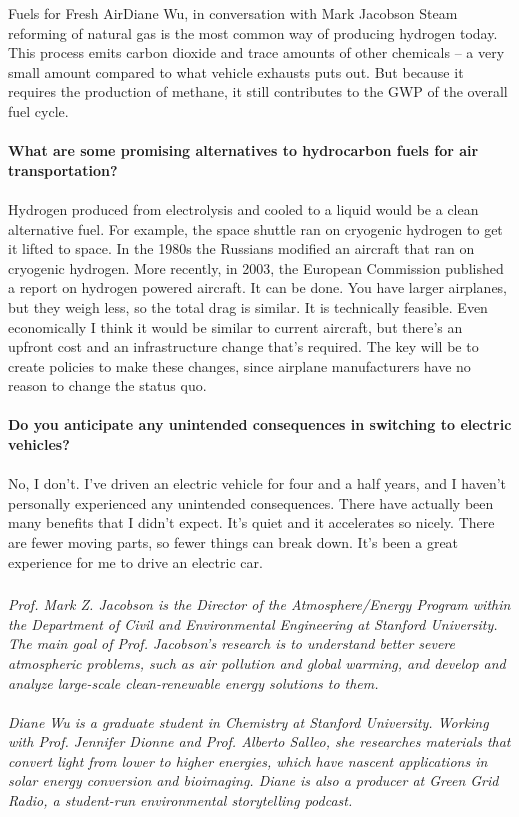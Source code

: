 \documentclass[10pt]{papertex}
\begin{document}
\begin{news}{2}{Fuels for Fresh Air}{Diane Wu, in conversation with Mark Jacobson}{}{}
Steam reforming of natural gas is the most common way of producing hydrogen 
today. This process emits carbon dioxide and trace amounts of other 
chemicals – a very small amount compared to what vehicle exhausts puts out. 
But because it requires the production of methane, it still contributes to 
the GWP of the overall fuel cycle.
\\
\\
\textbf{What are some promising alternatives to hydrocarbon fuels for air 
    transportation?}
\\
\\
Hydrogen produced from electrolysis and cooled to a liquid would be a clean 
alternative fuel. For example, the space shuttle ran on cryogenic hydrogen to 
get it lifted to space. In the 1980s the Russians modified an aircraft that 
ran on cryogenic hydrogen. More recently, in 2003, the European Commission 
published a report on hydrogen powered aircraft. It can be done. You have 
larger airplanes, but they weigh less, so the total drag is similar. It is 
technically feasible. Even economically I think it would be similar to current 
aircraft, but there’s an upfront cost and an infrastructure change that’s 
required. The key will be to create policies to make these changes, since 
airplane manufacturers have no reason to change the status quo.
\\
\\
\textbf{Do you anticipate any unintended consequences in switching to electric 
    vehicles?}
\\
\\
No, I don’t. I’ve driven an electric vehicle for four and a half years, and I 
haven’t personally experienced any unintended consequences. There have 
actually been many benefits that I didn’t expect. It’s quiet and it 
accelerates so nicely. There are fewer moving parts, so fewer things can 
break down. It’s been a great experience for me to drive an electric car.

\subsubsection*{}

\emph{Prof. Mark Z. Jacobson is the Director of the Atmosphere/Energy Program 
within the Department of Civil and Environmental Engineering at Stanford 
University. The main goal of Prof. Jacobson’s research is to understand 
better severe atmospheric problems, such as air pollution and global warming, 
and develop and analyze large-scale clean-renewable energy solutions to them.}
\\
\\
\emph{Diane Wu is a graduate student in Chemistry at Stanford University. 
Working with Prof. Jennifer Dionne and Prof. Alberto Salleo, she researches 
materials that convert light from lower to higher energies, which have nascent 
applications in solar energy conversion and bioimaging. Diane is also a 
producer at Green Grid Radio, a student-run environmental storytelling 
podcast.}

\end{news}
\end{document}

